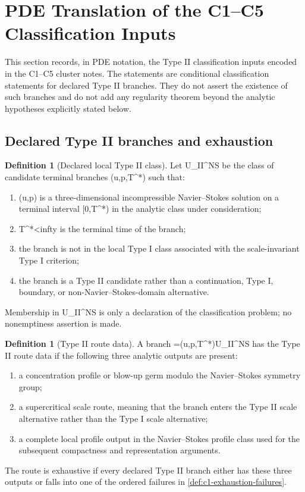 \documentclass[11pt]{amsart}
\def\({}%
\def\){}%
\def\mathrm#1{#1}%
\def\infty{infty}%
\theoremstyle{plain}
\theoremstyle{definition}
\newtheorem{definition}[theorem]{Definition}
\theoremstyle{remark}
\begin{document}
\clearpage
\section{PDE Translation of the C1--C5 Classification Inputs}
\label{sec:c1-c5-pde-translation}

This section records, in PDE notation, the Type II classification inputs encoded
in the C1--C5 cluster notes.  The statements are conditional classification
statements for declared Type II branches.  They do not assert the existence of
such branches and do not add any regularity theorem beyond the analytic
hypotheses explicitly stated below.

\subsection{Declared Type II branches and exhaustion}

\begin{definition}[Declared local Type II class]
\label{def:c1-declared-typeII-class}
Let \(\mathcal U_{\mathrm{II}}^{NS}\) be the class of candidate terminal
branches \((u,p,T^*)\) such that:
\begin{enumerate}[label=\textup{(\roman*)}]
\item \((u,p)\) is a three-dimensional incompressible Navier--Stokes solution
on a terminal interval \([0,T^*)\) in the analytic class under consideration;
\item \(T^*<\infty\) is the terminal time of the branch;
\item the branch is not in the local Type I class associated with the
scale-invariant Type I criterion;
\item the branch is a Type II candidate rather than a continuation, Type I,
boundary, or non-Navier--Stokes-domain alternative.
\end{enumerate}
Membership in \(\mathcal U_{\mathrm{II}}^{NS}\) is only a declaration of the
classification problem; no nonemptiness assertion is made.
\end{definition}

\begin{definition}[Type II route data]
\label{def:c1-typeII-route-data}
A branch \(\omega=(u,p,T^*)\in\mathcal U_{\mathrm{II}}^{NS}\) has the Type II
route data if the following three analytic outputs are present:
\begin{enumerate}[label=\textup{(\roman*)}]
\item a concentration profile or blow-up germ modulo the Navier--Stokes
symmetry group;
\item a supercritical scale route, meaning that the branch enters the Type II
scale alternative rather than the Type I scale alternative;
\item a complete local profile output in the Navier--Stokes profile class used
for the subsequent compactness and representation arguments.
\end{enumerate}
The route is exhaustive if every declared Type II branch either has these three
outputs or falls into one of the ordered failures in
\cref{def:c1-exhaustion-failures}.
\end{definition}
\end{document}
